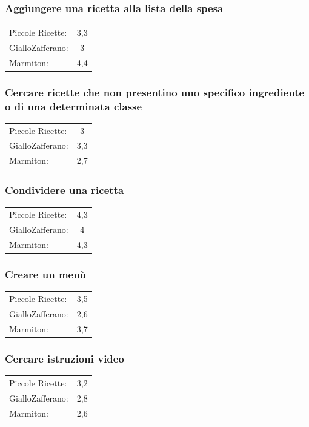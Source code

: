 \subsubsection{Aggiungere una ricetta alla lista della spesa}
\begin{tabular}{l c}
Piccole Ricette: & 3,3\\
GialloZafferano: & 3\\
Marmiton: & 4,4\\
\end{tabular}

\subsubsection{Cercare ricette che non presentino uno specifico ingrediente o di
una determinata classe}
\begin{tabular}{l c}
Piccole Ricette: & 3\\
GialloZafferano: & 3,3\\
Marmiton: & 2,7\\
\end{tabular}

\subsubsection{Condividere una ricetta}
\begin{tabular}{l c}
Piccole Ricette: & 4,3\\
GialloZafferano: & 4\\
Marmiton: & 4,3\\
\end{tabular}

\subsubsection{Creare un menù}
\begin{tabular}{l c}
Piccole Ricette: & 3,5\\
GialloZafferano: & 2,6\\
Marmiton: & 3,7\\
\end{tabular}

\subsubsection{Cercare istruzioni video}
\begin{tabular}{l c}
Piccole Ricette: & 3,2\\
GialloZafferano: & 2,8\\
Marmiton: & 2,6\\
\end{tabular}

